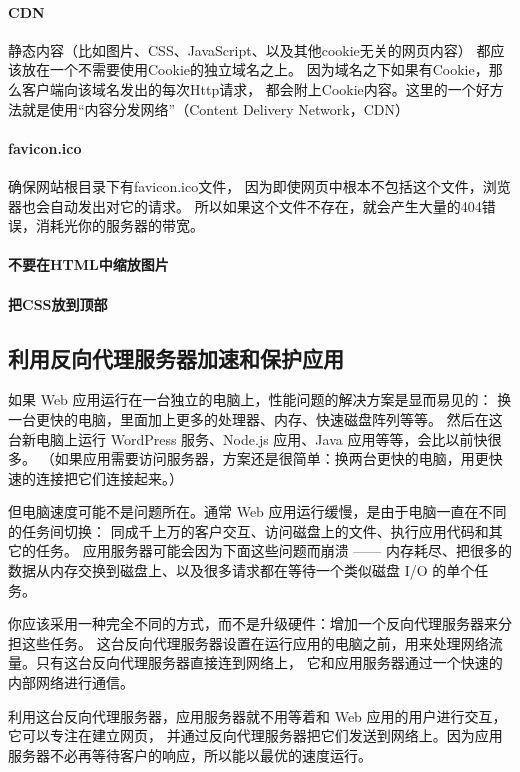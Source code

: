 \documentclass{book}
\begin{document}
\paragraph{CDN}静态内容（比如图片、CSS、JavaScript、以及其他cookie无关的网页内容）
都应该放在一个不需要使用Cookie的独立域名之上。
因为域名之下如果有Cookie，那么客户端向该域名发出的每次Http请求，
都会附上Cookie内容。这里的一个好方法就是使用“内容分发网络”（Content Delivery Network，CDN）

\paragraph{favicon.ico}确保网站根目录下有favicon.ico文件，
因为即使网页中根本不包括这个文件，浏览器也会自动发出对它的请求。
所以如果这个文件不存在，就会产生大量的404错误，消耗光你的服务器的带宽。

\paragraph{不要在HTML中缩放图片}

\paragraph{把CSS放到顶部}

\subsection{利用反向代理服务器加速和保护应用}

如果 Web 应用运行在一台独立的电脑上，性能问题的解决方案是显而易见的：
换一台更快的电脑，里面加上更多的处理器、内存、快速磁盘阵列等等。
然后在这台新电脑上运行 WordPress 服务、Node.js 应用、Java 应用等等，会比以前快很多。
（如果应用需要访问服务器，方案还是很简单：换两台更快的电脑，用更快速的连接把它们连接起来。）

但电脑速度可能不是问题所在。通常 Web 应用运行缓慢，是由于电脑一直在不同的任务间切换：
同成千上万的客户交互、访问磁盘上的文件、执行应用代码和其它的任务。
应用服务器可能会因为下面这些问题而崩溃 —— 内存耗尽、把很多的数据从内存交换到磁盘上、以及很多请求都在等待一个类似磁盘 I/O 的单个任务。

你应该采用一种完全不同的方式，而不是升级硬件：增加一个反向代理服务器来分担这些任务。
这台反向代理服务器设置在运行应用的电脑之前，用来处理网络流量。只有这台反向代理服务器直接连到网络上，
它和应用服务器通过一个快速的内部网络进行通信。

利用这台反向代理服务器，应用服务器就不用等着和 Web 应用的用户进行交互，它可以专注在建立网页，
并通过反向代理服务器把它们发送到网络上。因为应用服务器不必再等待客户的响应，所以能以最优的速度运行。
\end{document}
